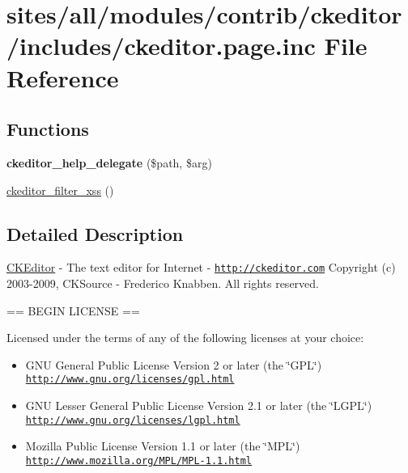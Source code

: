 \hypertarget{ckeditor_8page_8inc}{
\section{sites/all/modules/contrib/ckeditor/includes/ckeditor.page.inc File Reference}
\label{ckeditor_8page_8inc}
}
\subsection*{Functions}
\begin{CompactItemize}
\item 
\hypertarget{ckeditor_8page_8inc_3bce2a84a0acba544c2996bf15b29a6d}{
\textbf{ckeditor\_\-help\_\-delegate} (\$path, \$arg)}
\label{ckeditor_8page_8inc_3bce2a84a0acba544c2996bf15b29a6d}

\item 
\hyperlink{ckeditor_8page_8inc_08bc7bdbfbff2738fd935994c5fabdfb}{ckeditor\_\-filter\_\-xss} ()
\end{CompactItemize}


\subsection{Detailed Description}
\hyperlink{classCKEditor}{CKEditor} - The text editor for Internet - \href{http://ckeditor.com}{\tt http://ckeditor.com} Copyright (c) 2003-2009, CKSource - Frederico Knabben. All rights reserved.

== BEGIN LICENSE ==

Licensed under the terms of any of the following licenses at your choice:

\begin{itemize}
\item GNU General Public License Version 2 or later (the \char`\"{}GPL\char`\"{}) \href{http://www.gnu.org/licenses/gpl.html}{\tt http://www.gnu.org/licenses/gpl.html}\end{itemize}


\begin{itemize}
\item GNU Lesser General Public License Version 2.1 or later (the \char`\"{}LGPL\char`\"{}) \href{http://www.gnu.org/licenses/lgpl.html}{\tt http://www.gnu.org/licenses/lgpl.html}\end{itemize}


\begin{itemize}
\item Mozilla Public License Version 1.1 or later (the \char`\"{}MPL\char`\"{}) \href{http://www.mozilla.org/MPL/MPL-1.1.html}{\tt http://www.mozilla.org/MPL/MPL-1.1.html}\end{itemize}


